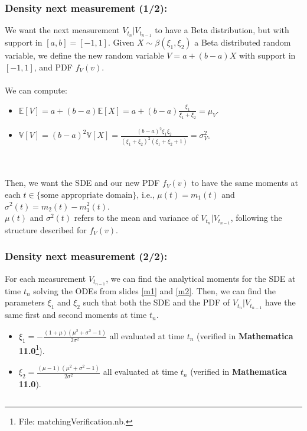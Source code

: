 \documentclass[aspectratio=169]{beamer}\usepackage[utf8]{inputenc}
\newcommand{\E}{\mathbb{E}}
\newcommand{\V}{\mathbb{V}}
\begin{document}
\begin{frame}\frametitle{Density next measurement (1/2):} \label{Tr}

We want the next measurement $V_{t_n}|V_{t_{n-1}}$ to have a Beta distribution, but with support in $[a,b]=[-1,1]$. Given $X\sim\beta(\xi_1,\xi_2)$ a \alert{Beta distributed random variable}, we define the new random variable $V=a+(b-a)X$ with support in $[-1,1]$, and PDF $f_V(v)$.\\
\quad\\
We can compute:
\begin{itemize}
\item $\E[V]=a+(b-a)\E[X]=a+(b-a)\frac{\xi_1}{\xi_1+\xi_2}=\mu_V$.
\item $\V[V]=(b-a)^2\V[X]=\frac{(b-a)^2\xi_1\xi_2}{(\xi_1+\xi_2)^2(\xi_1+\xi_2+1)}=\sigma^2_V$.
\end{itemize}
\quad\\
\quad\\
Then, we want the SDE and our new PDF $f_V(v)$ to have the same moments at each $t\in\{\text{some appropriate domain}\}$, i.e., $\mu(t)=m_1(t)$ and $\sigma^2(t)=m_2(t)-m_1^2(t)$.\\
$\mu(t)$ and $\sigma^2(t)$ refers to the mean and variance of $V_{t_n}|V_{t_{n-1}}$, following the structure described for $f_V(v)$.

\end{frame}


\begin{frame}\frametitle{Density next measurement (2/2):}

For each measurement $V_{t_{n-1}}$, we can find the analytical moments for the SDE at time $t_n$ solving the ODEs from slides {\color{blue}\ref{m1}} and {\color{blue}\ref{m2}}. Then, we can find the parameters $\xi_1$ and $\xi_2$ such that both the SDE and the PDF of $V_{t_n}|V_{t_{n-1}}$ have the same first and second moments at time $t_n$.
\begin{itemize}
\item $\xi_1=-\frac{(1+\mu)(\mu^2+\sigma^2-1)}{2\sigma^2}$ all evaluated at time $t_n$ (verified in \textbf{Mathematica 11.0}\footnote{File: {\color{blue}matchingVerification.nb}.}).
\item $\xi_2=\frac{(\mu-1)(\mu^2+\sigma^2-1)}{2\sigma^2}$ all evaluated at time $t_n$ (verified in \textbf{Mathematica 11.0}).
\end{itemize}

\begin{center}
\begin{tabular}{|c|}
\toprule
{\footnotesize

}\\
\bottomrule
\end{tabular}
\end{center}

\end{frame}
\end{document}
